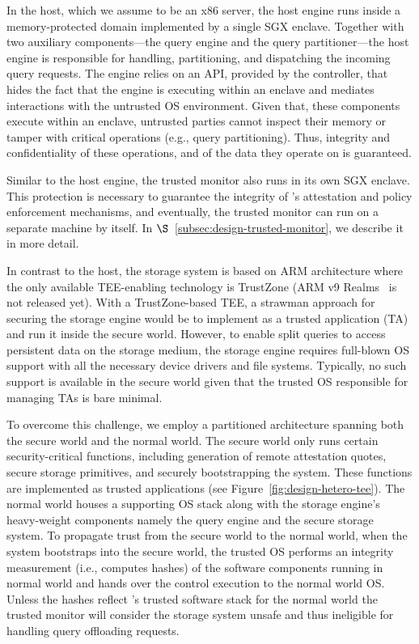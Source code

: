  In the host, which we assume to be an x86 server, the host engine runs inside a memory-protected domain implemented by a single SGX enclave. Together with two auxiliary components---the query engine and the query partitioner---the host engine is responsible for handling, partitioning, and dispatching the incoming query requests. The engine relies on an API, provided by the controller, that hides the fact that the engine is executing within an enclave and mediates interactions with the untrusted OS environment. Given that, these components execute within an enclave, untrusted parties cannot inspect their memory or tamper with critical operations (e.g., query partitioning). Thus, integrity and confidentiality of these operations, and of the data they operate on is guaranteed. %

 Similar to the host engine, the trusted monitor also runs in its own SGX enclave. This protection is necessary to guarantee the integrity of \project's attestation and policy enforcement mechanisms, and eventually, the trusted monitor can run on a separate machine by itself. In $\S$~\ref{subsec:design-trusted-monitor}, we describe it in more detail.

 In contrast to the host, the storage system is based on ARM architecture where the only available TEE-enabling technology is TrustZone (ARM v9 Realms~\cite{arm-cca} is not released yet). With a TrustZone-based TEE, a strawman approach for securing the storage engine would be to implement as a trusted application (TA) and run it inside the secure world. However, to enable split queries to access persistent data on the storage medium, the storage engine requires full-blown OS support with all the necessary device drivers and file systems. Typically, no such support is available in the secure world given that the trusted OS responsible for managing TAs is bare minimal.

To overcome this challenge, we employ a partitioned architecture spanning both the secure world and the normal world. The secure world only runs certain security-critical functions, including generation of remote attestation quotes, secure storage primitives, and securely bootstrapping the system. These functions are implemented as trusted applications (see Figure~\ref{fig:design-hetero-tee}). The normal world houses a supporting OS stack along with the storage engine's heavy-weight components namely the query engine and the secure storage system. To propagate trust from the secure world to the normal world, when the system bootstraps into the secure world, the trusted OS performs an integrity measurement (i.e., computes hashes) of the software components running in normal world and hands over the control execution to the normal world OS. Unless the hashes reflect \project's trusted software stack for the normal world the trusted monitor will consider the storage system unsafe and thus ineligible for handling query offloading requests.

